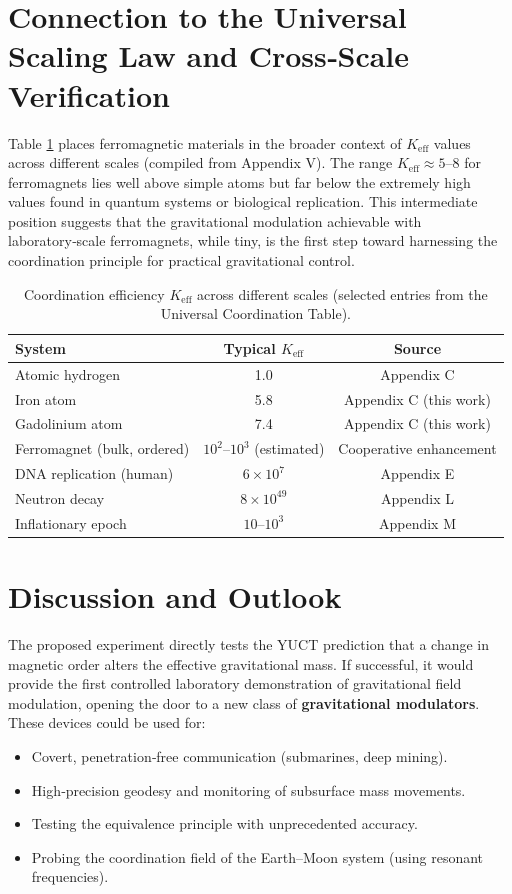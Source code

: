 \documentclass[12pt,a4paper]{article}
\newcommand{\Keff}{K_{\mathrm{eff}}}
\begin{document}
	\section{Connection to the Universal Scaling Law and Cross‑Scale Verification}
	\label{sec:scaling}
	
	Table \ref{tab:keff-scales} places ferromagnetic materials in the broader context of \(\Keff\) values across different scales (compiled from Appendix V). The range \(\Keff \approx 5\)–\(8\) for ferromagnets lies well above simple atoms but far below the extremely high values found in quantum systems or biological replication. This intermediate position suggests that the gravitational modulation achievable with laboratory‑scale ferromagnets, while tiny, is the first step toward harnessing the coordination principle for practical gravitational control.
	
	\begin{table}[htbp]
		\centering
		\caption{Coordination efficiency \(\Keff\) across different scales (selected entries from the Universal Coordination Table).}
		\label{tab:keff-scales}
		\small
		\begin{tabular}{lcc}
			\toprule
			System & Typical \(\Keff\) & Source \\
			\midrule
			Atomic hydrogen & 1.0 & Appendix C \\
			Iron atom & 5.8 & Appendix C (this work) \\
			Gadolinium atom & 7.4 & Appendix C (this work) \\
			Ferromagnet (bulk, ordered) & \(10^2\)–\(10^3\) (estimated) & Cooperative enhancement \\
			DNA replication (human) & \(6\times10^7\) & Appendix E \\
			Neutron decay & \(8\times10^{49}\) & Appendix L \\
			Inflationary epoch & \(10\)–\(10^3\) & Appendix M \\
			\bottomrule
		\end{tabular}
	\end{table}
	
	\section{Discussion and Outlook}
	\label{sec:discussion}
	
	The proposed experiment directly tests the YUCT prediction that a change in magnetic order alters the effective gravitational mass. If successful, it would provide the first controlled laboratory demonstration of gravitational field modulation, opening the door to a new class of \textbf{gravitational modulators}. These devices could be used for:
	\begin{itemize}
		\item Covert, penetration‑free communication (submarines, deep mining).
		\item High‑precision geodesy and monitoring of subsurface mass movements.
		\item Testing the equivalence principle with unprecedented accuracy.
		\item Probing the coordination field of the Earth–Moon system (using resonant frequencies).
	\end{itemize}
	
\end{document}
